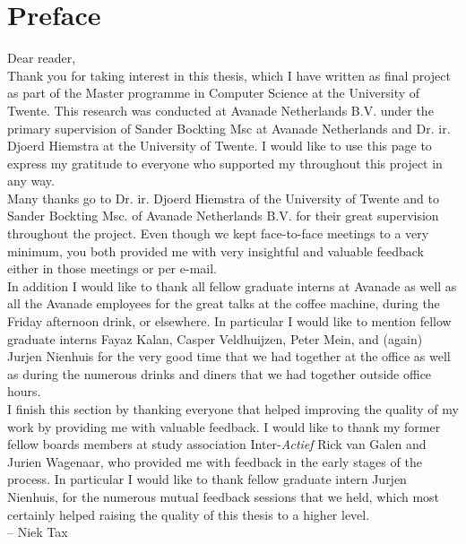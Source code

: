 
\bigskip

\begingroup
\let\clearpage\relax
\let\cleardoublepage\relax
\let\cleardoublepage\relax
\chapter*{Preface}
Dear reader,\\

Thank you for taking interest in this thesis, which I have written as final project as part of the Master programme in Computer Science at the University of Twente. This research was conducted at Avanade Netherlands B.V. under the primary supervision of Sander Bockting Msc at Avanade Netherlands and Dr. ir. Djoerd Hiemstra at the University of Twente. I would like to use this page to express my gratitude to everyone who supported my throughout this project in any way.\\

Many thanks go to Dr. ir. Djoerd Hiemstra of the University of Twente and to Sander Bockting Msc. of Avanade Netherlands B.V. for their great supervision throughout the project. Even though we kept face-to-face meetings to a very minimum, you both provided me with very insightful and valuable feedback either in those meetings or per e-mail.\\

In addition I would like to thank all fellow graduate interns at Avanade as well as all the Avanade employees for the great talks at the coffee machine, during the Friday afternoon drink, or elsewhere. In particular I would like to mention fellow graduate interns Fayaz Kalan, Casper Veldhuijzen, Peter Mein, and (again) Jurjen Nienhuis for the very good time that we had together at the office as well as during the numerous drinks and diners that we had together outside office hours.\\

I finish this section by thanking everyone that helped improving the quality of my work by providing me with valuable feedback. I would like to thank my former fellow boards members at study association Inter-\emph{Actief} Rick van Galen and Jurien Wagenaar, who provided me with feedback in the early stages of the process. In particular I would like to thank fellow graduate intern Jurjen Nienhuis, for the numerous mutual feedback sessions that we held, which most certainly helped raising the quality of this thesis to a higher level.\\

-- Niek Tax

\endgroup



